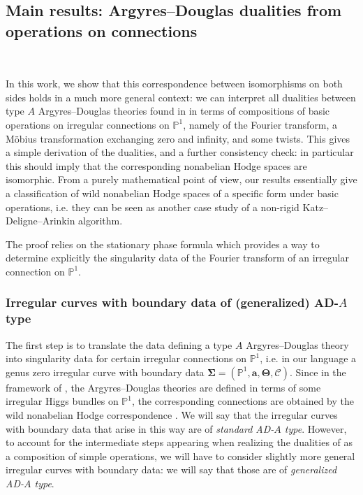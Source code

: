 \documentclass[11pt,a4paper]{amsart}
\numberwithin{equation}{section}
\begin{document}
\subsection{Main results: Argyres--Douglas dualities from operations on connections}~

In this work, we show that this correspondence between isomorphisms on both sides holds in a much more general context: we can interpret all dualities between type $A$ Argyres--Douglas theories found in \cite{beem2025simplifying} in terms of compositions of basic operations on irregular connections on $\mathbb P^1$, namely of the Fourier transform, a Möbius transformation exchanging zero and infinity, and some twists. This gives a simple derivation of the dualities, and a further consistency check: in particular this should imply that the corresponding nonabelian Hodge spaces are isomorphic. From a purely mathematical point of view, our results essentially give a classification of wild nonabelian Hodge spaces of a specific form under basic operations, i.e. they can be seen as another case study of a non-rigid Katz--Deligne--Arinkin algorithm.

The proof relies on the stationary phase formula \cite{malgrange1991equations,fang2009calculation,sabbah2008explicit,graham2013calculation} which provides a way to determine explicitly the singularity data of the Fourier transform of an irregular connection on $\mathbb P^1$.

\subsubsection{Irregular curves with boundary data of (generalized) AD-$A$ type}

The first step is to translate the data defining a type $A$ Argyres--Douglas theory into singularity data for certain irregular connections on $\mathbb P^1$, i.e. in our language a genus zero irregular curve with boundary data $\bm\Sigma=(\mathbb P^1,\mathbf a, \bm\Theta, \bm{\mathcal C})$. 
Since in the framework of \cite{beem2025simplifying}, the Argyres--Douglas theories are defined in terms of some irregular Higgs bundles on $\mathbb P^1$, the corresponding connections are obtained by the wild nonabelian Hodge correspondence \cite{biquard2004wild}. We will say that the irregular curves with boundary data that arise in this way are of \emph{standard AD-$A$ type}. However, to account for the intermediate steps appearing when realizing the dualities of \cite{beem2025simplifying} as a composition of simple operations, we will have to consider slightly more general irregular curves with boundary data: we will say that those are of \emph{generalized AD-$A$ type}. 
\end{document}
